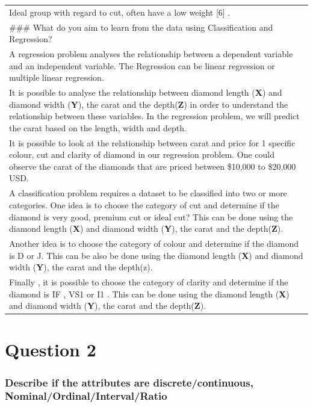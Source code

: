 \documentclass[
]{article}
\begin{document}
\begin{longtable}[]{@{}
  >{\raggedright\arraybackslash}p{}@{}}
Ideal group with regard to cut, often have a low weight {[}6{]} . \\
\#\#\# What do you aim to learn from the data using Classification and
Regression? \\
A regression problem analyses the relationship between a dependent
variable and an independent variable. The Regression can be linear
regression or multiple linear regression. \\
It is possible to analyse the relationship between diamond length
(\textbf{X}) and diamond width (\textbf{Y}), the carat and the
depth(\textbf{Z}) in order to understand the relationship between these
variables. In the regression problem, we will predict the carat based on
the length, width and depth. \\
It is possible to look at the relationship between carat and price for 1
specific colour, cut and clarity of diamond in our regression problem.
One could observe the carat of the diamonds that are priced between
\$10,000 to \$20,000 USD. \\
A classification problem requires a dataset to be classified into two or
more categories. One idea is to choose the category of cut and determine
if the diamond is very good, premium cut or ideal cut? This can be done
using the diamond length (\textbf{X}) and diamond width (\textbf{Y}),
the carat and the depth(\textbf{Z}). \\
Another idea is to choose the category of colour and determine if the
diamond is D or J. This can be also be done using the diamond length
(\textbf{X}) and diamond width (\textbf{Y}), the carat and the
depth(z). \\
Finally , it is possible to choose the category of clarity and determine
if the diamond is IF , VS1 or I1 . This can be done using the diamond
length (\textbf{X}) and diamond width (\textbf{Y}), the carat and the
depth(\textbf{Z}). \\
\end{longtable}

\hypertarget{question-2}{%
\section{Question 2}\label{question-2}}

\hypertarget{describe-if-the-attributes-are-discretecontinuous-nominalordinalintervalratio}{%
\subsubsection{Describe if the attributes are discrete/continuous,
Nominal/Ordinal/Interval/Ratio}\label{describe-if-the-attributes-are-discretecontinuous-nominalordinalintervalratio}}
\end{document}
